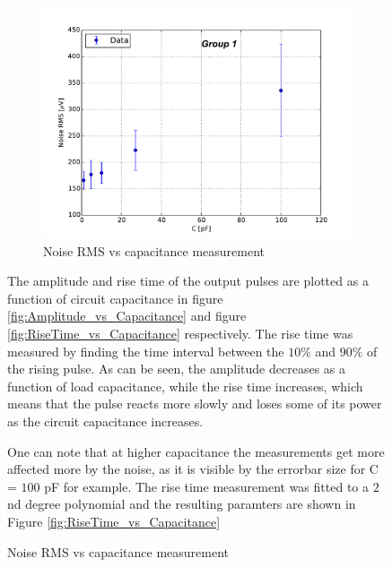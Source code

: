 \documentclass[12pt]{article}
\begin{document}
\begin{figure}[h]
 \centering
  \begin{subfigure}[t]{0.45\textwidth}
  \centering
  \includegraphics[width=1.2\textwidth]{./graphics/noise_vs_capacitance}
  \caption{Noise RMS vs capacitance measurement}
  \label{fig:Noise_vs_Capacitance}
\end{subfigure}


  The amplitude and rise time of the output pulses are plotted as a function of circuit capacitance in figure \ref{fig:Amplitude_vs_Capacitance} and figure \ref{fig:RiseTime_vs_Capacitance} respectively. The rise time was measured by finding the time interval between the $10\%$ and $90\%$ of the rising pulse. As can be seen, the amplitude decreases as a function of load capacitance, while the rise time increases, which means that the pulse reacts more slowly  and loses some of its power as the circuit capacitance increases.

 One can note that at higher capacitance the measurements get more affected more by the noise, as it is visible by the errorbar size for C = $100$ pF for example. The rise time measurement was fitted to a $2$nd degree polynomial and the resulting paramters are shown in Figure \ref{fig:RiseTime_vs_Capacitance}


\end{figure}
\end{document}
